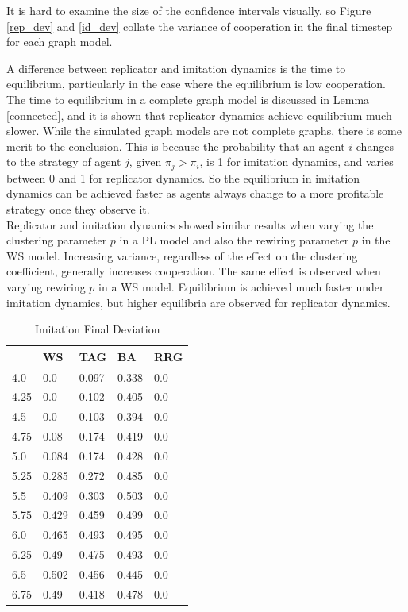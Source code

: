 It is hard to examine the size of the confidence intervals visually, so Figure \ref{rep_dev} and \ref{id_dev} collate the variance of cooperation in the final timestep for each graph model. \\




A difference between replicator and imitation dynamics is the time to equilibrium, particularly in the case where the equilibrium is low cooperation. The time to equilibrium in a complete graph model is discussed in Lemma \ref{connected}, and it is shown that replicator dynamics achieve equilibrium much slower. While the simulated graph models are not complete graphs, there is some merit to the conclusion. This is because the probability that an agent $i$ changes to the strategy of agent $j$, given $\pi_j>\pi_i$, is 1 for imitation dynamics, and varies between 0 and 1 for replicator dynamics. So the equilibrium in imitation dynamics can be achieved faster as agents always change to a more profitable strategy once they observe it. \\



Replicator and imitation dynamics showed similar results when varying the clustering parameter $p$ in a PL model and also the rewiring parameter $p$ in the WS model. Increasing variance, regardless of the effect on the clustering coefficient, generally increases cooperation. The same effect is observed when varying rewiring $p$ in a WS model. Equilibrium is achieved much faster under imitation dynamics, but higher equilibria are observed for replicator dynamics. 



\begin{table}[]
\begin{tabular}{|l|l|l|l|l|}
\hline
     & WS    & TAG   & BA    & RRG \\ \hline
4.0  & 0.0   & 0.097 & 0.338 & 0.0 \\ \hline
4.25 & 0.0   & 0.102 & 0.405 & 0.0 \\ \hline
4.5  & 0.0   & 0.103 & 0.394 & 0.0 \\ \hline
4.75 & 0.08  & 0.174 & 0.419 & 0.0 \\ \hline
5.0  & 0.084 & 0.174 & 0.428 & 0.0 \\ \hline
5.25 & 0.285 & 0.272 & 0.485 & 0.0 \\ \hline
5.5  & 0.409 & 0.303 & 0.503 & 0.0 \\ \hline
5.75 & 0.429 & 0.459 & 0.499 & 0.0 \\ \hline
6.0  & 0.465 & 0.493 & 0.495 & 0.0 \\ \hline
6.25 & 0.49  & 0.475 & 0.493 & 0.0 \\ \hline
6.5  & 0.502 & 0.456 & 0.445 & 0.0 \\ \hline
6.75 & 0.49  & 0.418 & 0.478 & 0.0 \\ \hline
\end{tabular}
\caption{Imitation Final Deviation}
\label{tab:ID_dev}
\end{table}

